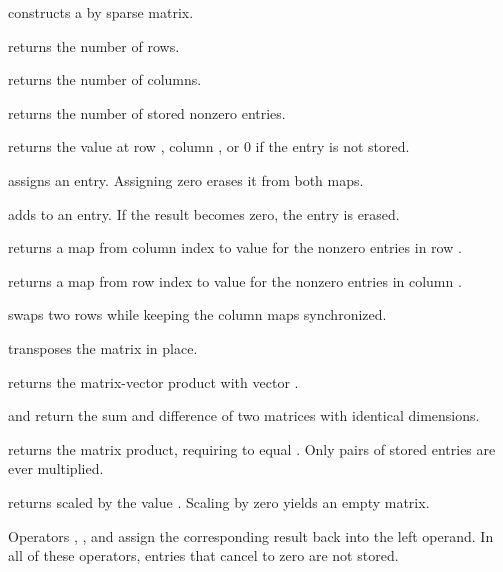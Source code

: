 \begin{compactitem}
  \item {} constructs a  by  sparse matrix.
  \item {} returns the number of rows.
  \item {} returns the number of columns.
  \item {} returns the number of stored nonzero entries.
  \item {} returns the value at row , column , or $0$ if the entry is not stored.
  \item {} assigns an entry. Assigning zero erases it from both maps.
  \item {} adds  to an entry. If the result becomes zero, the entry is erased.
  \item {} returns a map from column index to value for the nonzero entries in row .
  \item {} returns a map from row index to value for the nonzero entries in column .
  \item {} swaps two rows while keeping the column maps synchronized.
  \item {} transposes the matrix in place.
  \item {} returns the matrix-vector product with vector .
  \item {} and  return the sum and difference of two matrices with identical dimensions.
  \item {} returns the matrix product, requiring  to equal . Only pairs of stored entries are ever multiplied.
  \item {} returns  scaled by the value . Scaling by zero yields an empty matrix.
  \item Operators \inlinecode{+=}, \inlinecode{-=}, and \inlinecode{*=} assign the corresponding result back into the left operand. In all of these operators, entries that cancel to zero are not stored.
\end{compactitem}

